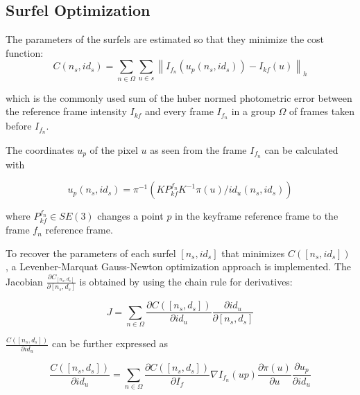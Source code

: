 \documentclass[1p]{elsarticle}
\begin{document}
\subsection{Surfel Optimization}
\label{sec:surfel_optimization}

The parameters of the surfels are estimated so that they minimize the cost function:
\begin{equation}
	C(n_{s},id_{s}) = \sum_{n \in \Omega} \sum_{u \in s} \left \| I_{f_{n}}(u_{p}(n_{s}, id_{s})) - I_{kf}(u) \right \|_{h}
	\label{equ:cost_function}
\end{equation}

which is the commonly used sum of the huber normed photometric error \cite{Newcombe_et_al_2011a} \cite{Pizzoli_et_al_2014} \cite{Engel-et-al-pami2018} between the reference frame intensity $I_{kf}$ and every frame $I_{f_{n}}$ in a group $\Omega$ of frames taken before $I_{f_{n}}$.

The coordinates $u_{p}$ of the pixel $u$ as seen from the frame $I_{f_n}$ can be calculated with

\begin{equation}
	u_{p}(n_{s}, id_{s}) = \pi^{-1}(KP_{kf}^{f_{n}} K^{-1}\pi(u)/id_{u}(n_{s}, id_{s}))
	\label{equ:reprojection}
\end{equation}

where $P_{kf}^{f_{n}}\in SE(3)$ changes a point $p$ in the keyframe reference frame to the frame $f_{n}$ reference frame.

To recover the parameters of each surfel $[n_{s},id_{s}]$ that minimizes $C([n_{s},id_{s}])$ , a Levenber-Marquat \cite{Engel-et-al-pami2018} Gauss-Newton optimization approach is implemented. The Jacobian $\frac{\partial C_{[n_{s}, d_{s}]}}{\partial [n_{s}, d_{s}]}$ is obtained by using the chain rule for derivatives:

\begin{equation}
	J =  \sum_{n \in \Omega} \frac{\partial C([n_{s}, d_{s}])}{\partial id_{u}} \frac{\partial id_{u}}{\partial [n_{s}, d_{s}]}
	\label{equ:jacobian}
\end{equation}

$\frac{C([n_{s}, d_{s}])}{\partial id_{u}}$ can be further expressed as

\begin{equation}
	\frac{C([n_{s}, d_{s}])}{\partial id_{u}} =  \sum_{n \in \Omega} \frac{\partial C([n_{s}, d_{s}])}{\partial I_{f}} \nabla I_{f_{n}}(up) \frac{\partial \pi(u)}{\partial u} \frac{\partial u_{p}}{\partial id_{u}}
	\label{equ:cost_derivative}
\end{equation}
\end{document}
